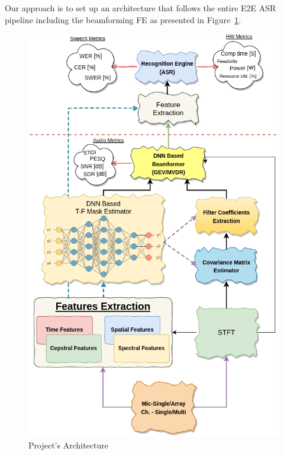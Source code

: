 Our approach is to set up an architecture 
that follows the entire E2E ASR pipeline including
the beamforming FE as presented in
Figure~\ref{fig:proj_blocks}.
\begin{figure}[H]
	\vspace{-2.65cm}
	\centering
	\includegraphics[width=\textwidth]
	{Introduction/images/proj_blocks2}
	\caption{Project's Architecture}\label{fig:proj_blocks}
\end{figure}



